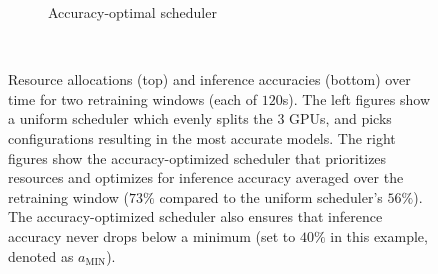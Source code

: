 \begin{figure}[t!]
\begin{subfigure}[t]{0.47\columnwidth}
    \caption{Accuracy-optimal scheduler}
    \label{fig:schedmot-prioritization}
  \end{subfigure}
  ~~
  \caption{Resource allocations (top) and inference accuracies (bottom) over time for two retraining windows (each of $120$s). The left figures show a uniform scheduler which evenly splits the $3$ GPUs, and picks configurations resulting in the most accurate models. The right figures show the accuracy-optimized scheduler that prioritizes resources and optimizes for inference accuracy averaged over the retraining window ($73\%$ compared to the uniform scheduler's $56\%$). The accuracy-optimized scheduler also ensures that inference accuracy never drops below a minimum (set to $40\%$ in this example, denoted as $a_\text{MIN}$). %
  }
  \label{fig:schedmot}
\end{figure}


